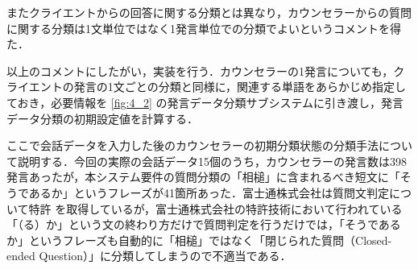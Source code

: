 \documentclass[shuuron]{kuee}
\begin{document}
またクライエントからの回答に関する分類とは異なり，カウンセラーからの質問に関する分類は1文単位ではなく1発言単位での分類でよいというコメントを得た．


以上のコメントにしたがい，実装を行う．カウンセラーの1発言についても，クライエントの発言の1文ごとの分類と同様に，関連する単語をあらかじめ指定しておき，必要情報を
\ref{fig:4_2}
の発言データ分類サブシステムに引き渡し，発言データ分類の初期設定値を計算する．

ここで会話データを入力した後のカウンセラーの初期分類状態の分類手法について説明する．今回の実際の会話データ15個のうち，カウンセラーの発言数は398発言あったが，本システム要件の質問分類の「相槌」に含まれるべき短文に「そうであるか」というフレーズが41箇所あった．富士通株式会社は質問文判定について特許
\cite{tokkyo}
を取得しているが，富士通株式会社の特許技術において行われている「（る）か」という文の終わり方だけで質問判定を行うだけでは，「そうであるか」というフレーズも自動的に「相槌」ではなく「閉じられた質問（Closed-ended Question）」に分類してしまうので不適当である．




\end{document}
